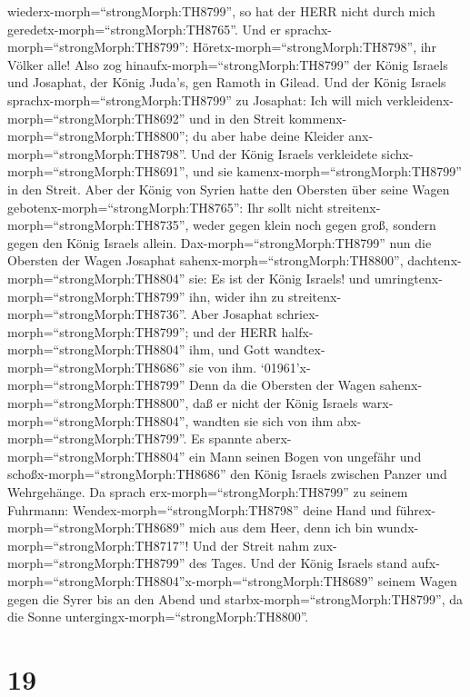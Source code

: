 wiederx-morph=``strongMorph:TH8799'', so hat der HERR nicht durch mich
geredetx-morph=``strongMorph:TH8765''. Und er
sprachx-morph=``strongMorph:TH8799'':
Höretx-morph=``strongMorph:TH8798'', ihr Völker alle!  Also
zog hinaufx-morph=``strongMorph:TH8799'' der König Israels und Josaphat,
der König Juda's, gen Ramoth in Gilead.  Und der König
Israels sprachx-morph=``strongMorph:TH8799'' zu Josaphat: Ich will mich
verkleidenx-morph=``strongMorph:TH8692'' und in den Streit
kommenx-morph=``strongMorph:TH8800''; du aber habe deine Kleider
anx-morph=``strongMorph:TH8798''. Und der König Israels verkleidete
sichx-morph=``strongMorph:TH8691'', und sie
kamenx-morph=``strongMorph:TH8799'' in den Streit.  Aber
der König von Syrien hatte den Obersten über seine Wagen
gebotenx-morph=``strongMorph:TH8765'': Ihr sollt nicht
streitenx-morph=``strongMorph:TH8735'', weder gegen klein noch gegen
groß, sondern gegen den König Israels allein. 
Dax-morph=``strongMorph:TH8799'' nun die Obersten der Wagen Josaphat
sahenx-morph=``strongMorph:TH8800'',
dachtenx-morph=``strongMorph:TH8804'' sie: Es ist der König Israels! und
umringtenx-morph=``strongMorph:TH8799'' ihn, wider ihn zu
streitenx-morph=``strongMorph:TH8736''. Aber Josaphat
schriex-morph=``strongMorph:TH8799''; und der HERR
halfx-morph=``strongMorph:TH8804'' ihm, und Gott
wandtex-morph=``strongMorph:TH8686'' sie von ihm. 
`01961'\textbar x-morph=``strongMorph:TH8799'' Denn da die Obersten der
Wagen sahenx-morph=``strongMorph:TH8800'', daß er nicht der König
Israels warx-morph=``strongMorph:TH8804'', wandten sie sich von ihm
abx-morph=``strongMorph:TH8799''.  Es spannte
aberx-morph=``strongMorph:TH8804'' ein Mann seinen Bogen von ungefähr
und schoßx-morph=``strongMorph:TH8686'' den König Israels zwischen
Panzer und Wehrgehänge. Da sprach erx-morph=``strongMorph:TH8799'' zu
seinem Fuhrmann: Wendex-morph=``strongMorph:TH8798'' deine Hand und
führex-morph=``strongMorph:TH8689'' mich aus dem Heer, denn ich bin
wundx-morph=``strongMorph:TH8717''!  Und der Streit nahm
zux-morph=``strongMorph:TH8799'' des Tages. Und der König Israels stand
aufx-morph=``strongMorph:TH8804''x-morph=``strongMorph:TH8689'' seinem
Wagen gegen die Syrer bis an den Abend und
starbx-morph=``strongMorph:TH8799'', da die Sonne
untergingx-morph=``strongMorph:TH8800''.

\hypertarget{section-18}{%
\section{19}\label{section-18}}

